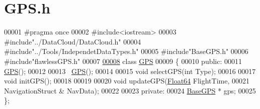 \hypertarget{_g_p_s_8h_source}{}\section{G\+P\+S.\+h}
\label{_g_p_s_8h_source}

\begin{DoxyCode}
00001 \textcolor{preprocessor}{#pragma once}
00002 \textcolor{preprocessor}{#include<iostream>}
00003 \textcolor{preprocessor}{#include"../DataCloud/DataCloud.h"}
00004 \textcolor{preprocessor}{#include"../Tools/IndependetDataTypes.h"}
00005 \textcolor{preprocessor}{#include"BaseGPS.h"}
00006 \textcolor{preprocessor}{#include"flawlessGPS.h"}
00007 
\hyperlink{class_g_p_s}{00008} \textcolor{keyword}{class }\hyperlink{class_g_p_s}{GPS}
00009 \{
00010 \textcolor{keyword}{public}:
00011     \hyperlink{class_g_p_s}{GPS}();
00012 
00013     ~\hyperlink{class_g_p_s}{GPS}();
00014 
00015     \textcolor{keywordtype}{void} selectGPS(\textcolor{keywordtype}{int} Type);
00016 
00017     \textcolor{keywordtype}{void} initGPS();
00018 
00019 
00020     \textcolor{keywordtype}{void} updateGPS(\hyperlink{group___tools_ga3f1431cb9f76da10f59246d1d743dc2c}{Float64} FlightTime,
00021                     NavigationStruct & NavData);
00022 
00023 \textcolor{keyword}{private}:
00024     \hyperlink{class_base_g_p_s}{BaseGPS} * gps;
00025 \};
\end{DoxyCode}

